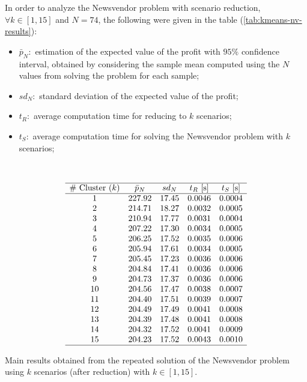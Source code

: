 \documentclass[a4paper,12pt]{article}
\begin{document}
	In order to analyze the Newsvendor problem with scenario reduction, $\forall k \in [1,15]$ and $N = 74$, the following were given in the table (\ref{tab:kmeans-nv-results}):
	\begin{itemize}
		\item $\bar{p}_{N}:$ estimation of the expected value of the profit with $95\%$ confidence interval, obtained by considering the sample mean computed using the $N$ values from solving the problem for each sample; 
		\item $sd_{N}:$ standard deviation of the expected value of the profit;
		\item $t_{R}:$ average computation time for reducing to $k$ scenarios;
		\item $t_{S}:$ average computation time for solving the Newsvendor problem with $k$ scenarios;
	\end{itemize}~
	\begin{table}[H]
		\[
		\begin{array}{ccccc}
			\hline
			\text{\# Cluster $(k)$} & \text{$\bar{p}_{N}$} & \text{$sd_{N}$} & \text{$t_{R}$ [s]} & \text{$t_{S}$ [s]} \\
			\hline
			1 & 227.92 & 17.45 & 0.0046 & 0.0004 \\
			2 & 214.71 & 18.27 & 0.0032 & 0.0005 \\
			3 & 210.94 & 17.77 & 0.0031 & 0.0004 \\
			4 & 207.22 & 17.30 & 0.0034 & 0.0005 \\
			5 & 206.25 & 17.52 & 0.0035 & 0.0006 \\
			6 & 205.94 & 17.61 & 0.0034 & 0.0005 \\
			7 & 205.45 & 17.23 & 0.0036 & 0.0006 \\
			8 & 204.84 & 17.41 & 0.0036 & 0.0006 \\
			9 & 204.73 & 17.37 & 0.0036 & 0.0006 \\
			10 & 204.56 & 17.47 & 0.0038 & 0.0007 \\
			11 & 204.40 & 17.51 & 0.0039 & 0.0007 \\
			12 & 204.49 & 17.49 & 0.0041 & 0.0008 \\
			13 & 204.39 & 17.48 & 0.0041 & 0.0008 \\
			14 & 204.32 & 17.52 & 0.0041 & 0.0009 \\
			15 & 204.23 & 17.52 & 0.0043 & 0.0010 \\
			\hline
		\end{array}
		\]
		\label{tab:kmeans-nv-results}
		\caption{Main results obtained from the repeated solution of the Newsvendor problem using $k$ scenarios (after reduction) with $k \in [1,15]$.}
	\end{table}
		
\end{document}
